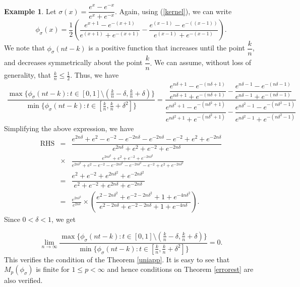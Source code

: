 \documentclass[12pt, reqno]{amsart}
\numberwithin{equation}{section}
\theoremstyle{definition}
\newtheorem{example}[theorem]{Example}
\theoremstyle{remark}
\numberwithin{equation}{section}
\begin{document}
\begin{example} \label{etanh}
Let $\sigma(x)=\dfrac{e^x - e^{-x}}{e^x + e^{-x}}.$ Again, using (\ref{kernel}), we can write $$\phi_\sigma(x)=\dfrac{1}{2}\left(\dfrac{e^{x+1}-e^{-(x+1)}}{e^{(x+1)}+e^{-(x+1)}}-\dfrac{e^{(x-1)}-e^{-((x-1))}}{e^{(x-1)}+e^{-(x-1)}}\right).$$ 
We note that $\phi_\sigma(nt-k)$ is a positive function that increases until the point $\dfrac{k}{n}$, and decreases symmetrically about the point $\dfrac{k}{n}.$ We can assume, without loss of generality,  that $\frac{k}{n}\leq\frac{1}{2}.$ Thus, we have
\begin{eqnarray*}
 \dfrac{\max\{\phi_\sigma(nt-k): t\in [0,1] \setminus(\frac{k}{n}-\delta, \frac{k}{n}+\delta) \}}{\min\{\phi_\sigma(nt-k): t\in[\frac{k}{n}, \frac{k}{n}+\delta^2]\}} = \dfrac{\dfrac{e^{n\delta+1}-e^{-(n\delta+1)}}{e^{n\delta+1}+e^{-(n\delta+1)}}-\dfrac{e^{n\delta-1}-e^{-(n\delta-1)}}{e^{n\delta-1}+e^{-(n\delta-1)}}} {\dfrac{e^{n\delta^2+1}-e^{-(n\delta^2+1)}}{e^{n\delta^2+1}+e^{-(n\delta^2+1)}}-\dfrac{e^{n\delta^2-1}-e^{-(n\delta^2-1)}}{e^{n\delta^2-1}+e^{-(n\delta^2-1)}}}
 \end{eqnarray*}
Simplifying the above expression, we have 
\begin{eqnarray*}
\text{RHS} &=& \dfrac{e^{2n\delta} + e^2 - e^{-2} - e^{-2n\delta} - e^{-2n\delta} - e^{-2} + e^2 + e^{-2n\delta}}{e^{2n\delta} + e^2 + e^{-2} + e^{-2n\delta}} \\
& \times & \frac{e^{2n\delta^2} + e^2 + e^{-2} + e^{-2n\delta^2}}{e^{2n\delta^2} + e^2 - e^{-2} - e^{-2n\delta^2} - e^{-2n\delta^2} - e^{-2} + e^2 + e^{-2n\delta^2}} \\
&=& \dfrac{e^2 + e^{-2} + e^{2n\delta^2} + e^{-2n\delta^2}}{e^2 + e^{-2} + e^{2n\delta} + e^{-2n\delta}} \\
&= & \frac{e^{2n\delta^2}}{e^{2n\delta}} \times \left( \dfrac{e^{2 - 2n\delta^2} + e^{-2 - 2n\delta^2} + 1 + e^{-4n\delta^2}}{e^{2 - 2n\delta} + e^{-2 - 2n\delta} + 1 + e^{-4n\delta}} \right).
\end{eqnarray*}
Since $0<\delta<1$, we get

$$\lim_{n\to\infty}\dfrac{\max\{\phi_\sigma(nt-k): t\in  [0,1]\setminus (\frac{k}{n}-\delta, \frac{k}{n}+\delta) \}}{\min\{\phi_\sigma(nt-k): t\in[\frac{k}{n}, \frac{k}{n}+\delta^2]\}}=0.$$ This verifies the condition of the Theorem \ref{uniapp}. It is easy to see that $M_p(\phi_\sigma)$ is finite for $1\leq p<\infty$ and hence conditions on Theorem \ref{errorest} are also verified.
\end{example}
\end{document}
